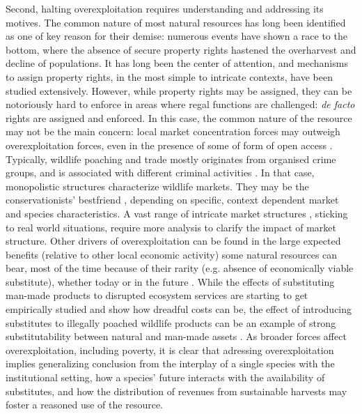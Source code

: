 	Second, halting overexploitation requires understanding and addressing its motives. The common nature of most natural resources \citep{Gordon1954, smith_models_1969} has long been identified as one of key reason for their demise: numerous events have shown a race to the bottom, where the absence of secure property rights hastened the overharvest and decline of populations. It has long been the center of attention, and mechanisms to assign property rights, in the most simple to intricate contexts, have been studied extensively. However, while property rights may be assigned, they can be notoriously hard to enforce in areas where regal functions are challenged: \textit{de facto} rights are assigned and enforced. In this case, the common nature of the resource may not be the main concern: local market concentration forces may outweigh overexploitation forces, even in the presence of some of form of open access \citep{damania_economics_2007}. Typically, wildlife poaching and trade mostly originates from organised crime groups, and is associated with different criminal activities \citep{mozer_introduction_2023}.  In that case, monopolistic structures characterize wildlife markets. They may  be the conservationists' bestfriend \citep{solow_resources_1974, hannesson_note_1983}, depending on specific, context dependent market and species characteristics. A vast range of intricate market  structures \citep{damania_economics_2007, hannesson_effects_1985}, sticking to real world situations, require more analysis to clarify the impact of market structure.
	Other drivers of overexploitation can be found in the large expected benefits (relative to other local economic activity) some natural resources can bear, most of the time because of their rarity (e.g. absence of economically viable substitute), whether today or in the future \citep{Kremer2000}. While the effects of substituting man-made products to disrupted ecosystem services are starting to get empirically studied \citep{frank_economic_2024} and show how dreadful costs can be, the effect of introducing substitutes to illegally poached wildlife products can be an example of strong substitutability between natural and man-made assets \citep{chen_economics_2017}. As broader forces affect overexploitation, including poverty, it is clear that adressing overexploitation implies generalizing conclusion from the interplay of a single species with the institutional setting, how a  species' future interacts with the availability of substitutes, and how the distribution of revenues from sustainable harvests may foster a reasoned use of the resource. 

